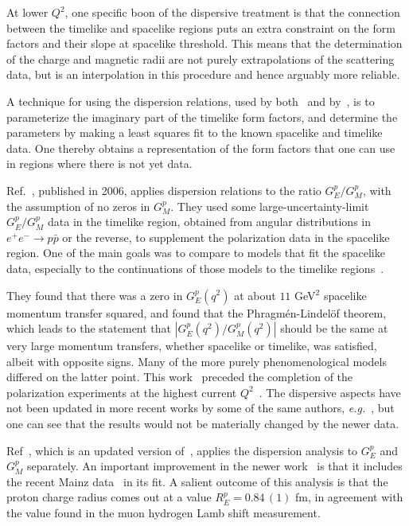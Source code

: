 At lower $Q^2$, one specific boon of the dispersive treatment is that the connection between the timelike and spacelike regions puts an extra constraint on the form factors and their slope at spacelike threshold.  This means that the determination of the charge and magnetic radii are not purely extrapolations of the scattering data, but is an interpolation in this procedure and hence arguably more reliable.

A technique for using the dispersion relations, used by both~\cite{Baldini:2005xx} and by~\cite{Lorenz:2012tm}, is to parameterize the imaginary part of the timelike form factors, and determine the parameters by making a least squares fit to the known spacelike and timelike data.  One thereby obtains a representation of the form factors that one can use in regions where there is not yet data.

Ref.~\cite{Baldini:2005xx}, published in 2006, applies dispersion relations to the ratio $G_E^p/G_M^p$, with the assumption of no zeros in $G_M^p$.  They used some large-uncertainty-limit $G_E^p/G_M^p$ data in the timelike region, obtained from angular distributions in $e^+ e^- \to p \bar p$ or the reverse, to supplement the polarization data in the spacelike region.  One of the main goals was to compare to models that fit the spacelike data, especially to the continuations of those models to the timelike regions~\cite{Brodsky:2003gs}.  

They found that there was a zero in $G_E^p(q^2)$ at about $11$ GeV$^2$ spacelike momentum transfer squared, and found that the Phragm\'en-Lindel\"of theorem, which leads to the statement that $|G_E^p(q^2)/G_M^p(q^2)|$ should be the same at very large momentum transfers, whether spacelike or timelike, was satisfied, albeit with opposite signs.  Many of the more purely phenomenological models differed on the latter point.  This work~\cite{Baldini:2005xx} preceded the completion of the polarization experiments at the highest current $Q^2$~\cite{puckett:2010,puckett:2011}.  The dispersive aspects have not been updated in more recent works by some of the same authors, \textit{e.g.}~\cite{BaldiniFerroli:2012pr}, but one can see that the results would not be materially changed by the newer data.

Ref~\cite{Lorenz:2012tm}, which is an updated version of~\cite{Belushkin:2006qa}, applies the dispersion analysis to $G_E^p$ and $G_M^p$ separately.  An important improvement in the newer work~\cite{Lorenz:2012tm} is that it includes the recent Mainz data~\cite{Bernauer:2010wm} in its fit.  A salient outcome of this analysis is that the proton charge radius comes out at a value $R_E^p = 0.84\, (1)$ fm, in agreement with the value found in the muon hydrogen Lamb shift measurement.

